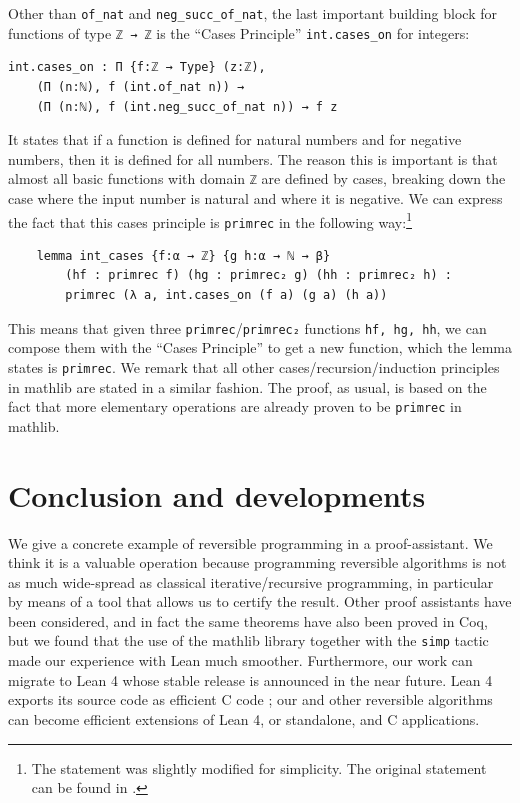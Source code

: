 \documentclass[preprint]{elsarticle}
\theoremstyle{remark}
\newcommand{\CPP}{\textsf{C}\xspace}
\newcommand{\MATHLIB}{\textsf{mathlib}\xspace}
\newcommand{\LEAN}{\textsf{Lean}\xspace}
\newcommand{\COQ}{\textsf{Coq}\xspace}
\newcommand{\LEANFour}{\textsf{Lean 4}\xspace}
\begin{document}
Other than \lstinline|of_nat| and \lstinline|neg_succ_of_nat|, the last important building block for functions of type \lstinline|ℤ → ℤ| is the ``Cases Principle'' \lstinline|int.cases_on| for integers:
\begin{lstlisting}
int.cases_on : Π {f:ℤ → Type} (z:ℤ),
    (Π (n:ℕ), f (int.of_nat n)) →
    (Π (n:ℕ), f (int.neg_succ_of_nat n)) → f z
\end{lstlisting}
\noindent
It states that if a function is defined for natural numbers and for negative numbers, then it is defined for all numbers.
The reason this is important is that almost all basic functions with domain \lstinline|ℤ| are defined by cases, breaking down the case where the input number is natural and where it is negative. We can express the fact that this cases principle is \lstinline|primrec| in the following way:\footnote{The statement was slightly modified for simplicity. The original statement can be found in \cite{MalettoRPPLEAN2021}.}
\begin{lstlisting}
    lemma int_cases {f:α → ℤ} {g h:α → ℕ → β}
        (hf : primrec f) (hg : primrec₂ g) (hh : primrec₂ h) :
        primrec (λ a, int.cases_on (f a) (g a) (h a))
\end{lstlisting}
\noindent
This means that given three \lstinline|primrec|/\lstinline|primrec₂| functions \lstinline|hf, hg, hh|, we can compose them with the ``Cases Principle'' to get a new function, which the lemma states is \lstinline|primrec|.
We remark that all other cases/recursion/induction principles in \MATHLIB are stated in a similar fashion. The proof, as usual, is based on the fact that more elementary operations are already proven to be \lstinline|primrec| in \MATHLIB.

\section{Conclusion and developments}
\label{section:Conclusion and developments}
We give a concrete example of reversible programming in a proof-assistant. We think it is a valuable operation because programming reversible algorithms is not as much wide-spread as classical iterative/recursive programming, in particular by means of a tool that allows us to certify the result.
Other proof assistants have been considered, and in fact the same theorems have also been proved in \COQ, but we found that the use of the \MATHLIB library together with the \lstinline|simp| tactic made our experience with \LEAN much smoother.
Furthermore, our work can migrate to \LEANFour whose stable release is announced in the near future. \LEANFour exports its source code as efficient \CPP code \cite{2021-LEAN4-MouraUllrich}; our and other reversible algorithms can become efficient extensions of \LEANFour, or standalone, and \CPP applications.
\end{document}
